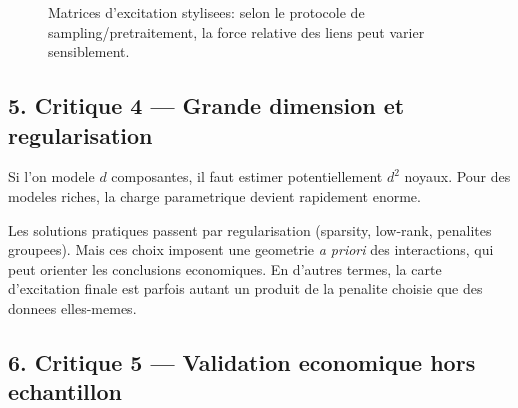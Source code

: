 \documentclass[11pt,a4paper]{article}
\begin{document}
\begin{figure}[H]
\centering
{}
\caption{Matrices d'excitation stylisees: selon le protocole de sampling/pretraitement, la force relative des liens peut varier sensiblement.}
\label{fig:heatmap_stylized}
\end{figure}

\subsection*{5. Critique 4 --- Grande dimension et regularisation}

Si l'on modele $d$ composantes, il faut estimer potentiellement $d^2$ noyaux. Pour des modeles riches, la charge parametrique devient rapidement enorme.

Les solutions pratiques passent par regularisation (sparsity, low-rank, penalites groupees). Mais ces choix imposent une geometrie \emph{a priori} des interactions, qui peut orienter les conclusions economiques. En d'autres termes, la carte d'excitation finale est parfois autant un produit de la penalite choisie que des donnees elles-memes.

\subsection*{6. Critique 5 --- Validation economique hors echantillon}
\end{document}
